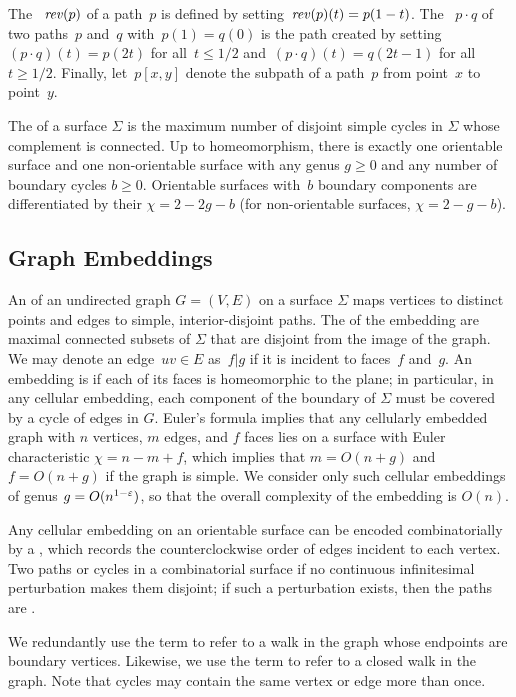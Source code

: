 The ~$\mathit{rev}(p)$ of a path~$p$ is defined by
setting~$\mathit{rev}(p)(t) = p(1-t)$. The ~$p \cdot q$ of two
paths~$p$ and~$q$ with~$p(1)=q(0)$ is the path created by
setting~$(p\cdot q)(t) = p(2t)$ for all~$t \leq 1/2$
and~$(p\cdot q)(t) = q(2t-1)$ for all~$t \geq 1/2$. Finally, let~$p[x,y]$
denote the subpath of a path~$p$ from point~$x$ to point~$y$.

The  of a surface $\Sigma$ is the maximum number of disjoint simple cycles in $\Sigma$ whose complement is connected.
 Up to homeomorphism,
there is exactly one orientable surface and one non-orientable surface with any genus $g\ge 0$ and any number of
boundary cycles $b\ge 0$.
Orientable surfaces with~$b$ boundary components are differentiated by their  ${\chi = 2 - 2g - b}$ (for non-orientable surfaces, ${\chi = 2 - g - b}$).


\subsection{Graph Embeddings}

An  of an undirected graph $G=(V,E)$ on a surface $\Sigma$ maps vertices to distinct points and edges to simple, interior-disjoint paths.  The  of the embedding are maximal connected subsets of $\Sigma$ that are disjoint from the image of the graph.
We may denote an edge~$uv \in E$ as~$f | g$ if it is incident to faces~$f$ and~$g$.
An embedding is  if each of its faces is homeomorphic to the plane; in particular, in any cellular embedding, each component of the boundary of $\Sigma$ must be covered by a cycle of edges in $G$.  Euler's formula implies that any cellularly embedded graph with $n$ vertices, $m$ edges, and $f$ faces lies on a surface with Euler characteristic $\chi = n-m+f$, which implies that $m = O(n+g)$ and $f=O(n+g)$
if the graph is simple.
We consider only such
cellular embeddings of genus $g=O(n^{1-\varepsilon})$, so that the overall complexity of the embedding is $O(n)$.

Any cellular embedding on an orientable surface can be encoded combinatorially
by a , which records the counterclockwise order of edges
incident to each vertex.
Two paths or cycles in a combinatorial surface  if no continuous infinitesimal perturbation makes them disjoint; if such a perturbation exists, then the paths are .

We redundantly use the term  to refer to a walk in the graph whose endpoints are boundary vertices.  Likewise, we use the term  to refer to a closed walk in the graph. 
Note that cycles may contain the same vertex or edge more than once.

